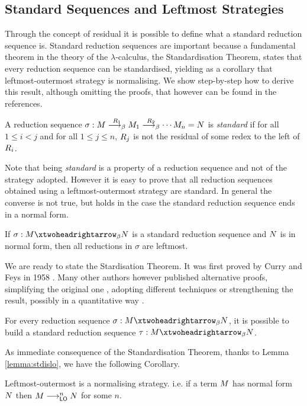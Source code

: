 \begin{THESIS}
	\subsection{Standard Sequences and Leftmost Strategies}
	Through the concept of residual it is possible to define what a standard reduction sequence is. Standard reduction sequences are important because a fundamental theorem in the theory of the $\lambda$-calculus, the Standardisation Theorem, states that every reduction sequence can be standardised, yielding as a corollary that leftmost-outermost strategy is normalising. We show step-by-step how to derive this result, although omitting the proofs, that however can be found in the references.  
	\begin{definition}
		A reduction sequence $\sigma:M\overset{R_1}{\longrightarrow_\beta}M_1\overset{R_2}{\longrightarrow_\beta}\cdots M_n=N$ is \emph{standard} if for all $1\leq i<j$ and for all $1\leq j\leq n$, $R_j$ is not the residual of some redex to the left of $R_i$.
	\end{definition}
	\begin{remark}
		Note that being \emph{standard} is a property of a reduction sequence and not of the strategy adopted. However it is easy to prove that all reduction sequences obtained using a leftmost-outermost strategy are standard. In general the converse is not true, but holds in the case the standard reduction sequence ends in a normal form.
	\end{remark}
	\begin{lemma}\label{lemma:stdislo}
		If $\sigma:\termone\redbetaclo\termtwo$ is a standard reduction sequence and $N$ is in normal form, then all reductions in $\sigma$ are leftmost.
	\end{lemma}
	We are ready to state the Stardisation Theorem. It was first proved by Curry and Feys in 1958 \cite{curry_combinatory_1958}. Many other authors however published alternative proofs, simplifying the original one \cite{mitschke_standardization_1979}, adopting different techniques \cite{klop_combinatory_1980} or strengthening the result, possibly in a quantitative way \cite{xi_upper_1999}.
	\begin{theorem}[Standardisation]
		For every reduction sequence $\sigma:\termone\redbetaclo\termtwo$, it is possible to build a standard reduction sequence $\tau:\termone\redbetaclo\termtwo$.
	\end{theorem}
	As immediate consequence of the Standardisation Theorem, thanks to Lemma \ref{lemma:stdislo}, we have the following Corollary.
	\begin{corollary}[Normalisation]
		Leftmost-outermost is a normalising strategy. i.e. if a term $M$ has normal form $N$ then $M\longrightarrow_{\textsf{LO}}^nN$ for some $n$.
	\end{corollary}
\end{THESIS}
